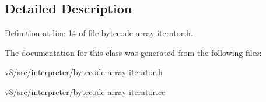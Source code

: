 \subsection{Detailed Description}


Definition at line 14 of file bytecode-\/array-\/iterator.\+h.



The documentation for this class was generated from the following files\+:\begin{DoxyCompactItemize}
\item 
v8/src/interpreter/bytecode-\/array-\/iterator.\+h\item 
v8/src/interpreter/bytecode-\/array-\/iterator.\+cc\end{DoxyCompactItemize}
